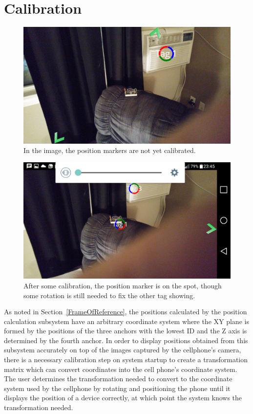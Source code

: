 \section{Calibration}
\label{Calibration}
\begin{figure}
	\centering
	\includegraphics[width=\linewidth]{Figures/Calibration1.png}
	\decoRule
	\caption{In the image, the position markers are not yet calibrated.}
	\label{fig:CameraLens}
\end{figure}
\begin{figure}
	\centering
	\includegraphics[width=\linewidth]{Figures/Calibration2.png}
	\decoRule
	\caption{After some calibration, the position marker is on the spot, though some rotation is still needed to fix the other tag showing.}
	\label{fig:CameraLens}
\end{figure}

As noted in Section~\ref{FrameOfReference}, the positions calculated by the position calculation subsystem have an arbitrary coordinate system where the XY plane is formed by the positions of the three anchors with the lowest ID and the Z axis is determined by the fourth anchor. In order to display positions obtained from this subsystem accurately on top of the images captured by the cellphone's camera, there is a necessary calibration step on system startup to create a transformation matrix which can convert coordinates into the cell phone's coordinate system. The user determines the transformation needed to convert to the coordinate system used by the cellphone by rotating and positioning the phone until it displays the position of a device correctly, at which point the system knows the transformation needed.

